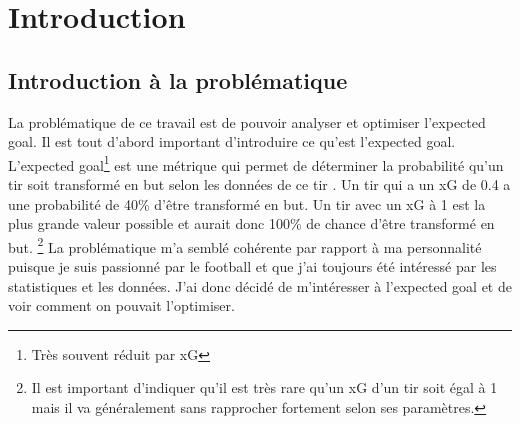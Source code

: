 \documentclass[12pt]{article}
\begin{document}
\newpage

\tableofcontents
\newpage

\section{Introduction}

\subsection{Introduction à la problématique}
\noindent La problématique de ce travail est de pouvoir analyser et optimiser l'expected goal.
\newline
Il est tout d'abord important d'introduire ce qu'est l'expected goal. L'expected goal\footnote{Très souvent réduit par xG} est une métrique qui permet de déterminer la probabilité qu'un tir soit transformé en but selon les données de ce tir \cite{XGExplainedFBrefa}. Un tir qui a un xG de 0.4 a une probabilité de 40\% d'être transformé en but. Un tir avec un xG à 1 est la plus grande valeur possible et aurait donc 100\% de chance d'être transformé en but. \footnote{Il est important d'indiquer qu'il est très rare qu'un xG d'un tir soit égal à 1 mais il va généralement sans rapprocher fortement selon ses paramètres.} \cite{pettyWhatExpectedGoals2018a}
\newline
La problématique m'a semblé cohérente par rapport à ma personnalité puisque je suis passionné par le football et que j'ai toujours été intéressé par les statistiques et les données. J'ai donc décidé de m'intéresser à l'expected goal et de voir comment on pouvait l'optimiser.
\end{document}
